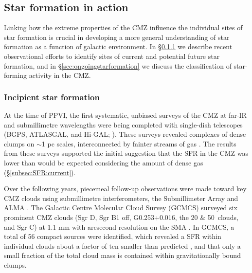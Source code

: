 \subsection{Star formation in action} 
\label{sec:sfinaction}

Linking how the extreme properties of the CMZ influence the individual sites of star formation is crucial in developing a more general understanding of star formation as a function of galactic environment. In \S\ref{sec:incipientsf} we describe recent observational efforts to identify sites of current and potential future star formation, and in \S\ref{sec:ongoingstarformation} we discuss the classification of star-forming activity in the CMZ.

\subsubsection{Incipient star formation} 
\label{sec:incipientsf}

At the time of PPVI, the first systematic, unbiased surveys of the CMZ at far-IR and submillimetre wavelengths were being completed with single-dish telescopes (BGPS, ATLASGAL, and Hi-GAL; \citealt{Bally2010, Molinari2011, Csengeri2016}). These surveys revealed complexes of dense clumps on $\sim$1 pc scales, interconnected by fainter streams of gas \citep[\S\ref{sec:3d};][]{Bally2010}. The results from these surveys supported the initial suggestion that the SFR in the CMZ was lower than would be expected considering the amount of dense gas (\S\ref{subsec:SFR:current}).

Over the following years, piecemeal follow-up observations were made toward key CMZ clouds using submillimetre interferometers, the Submillimeter Array \citep[SMA;][]{Kauffmann2013, Kauffmann2017a, Kauffmann2017b, Kendrew2013, Johnston2014, Lu2015, Lu2019b, Walker2018} and ALMA \citep{Rathborne2014b, Ginsburg2018b, Barnes2019, Uehara2019, Miyawaki2021, Walker2021, Lu2020, Lu2021}. The Galactic Centre Molecular Cloud Survey (GCMCS) surveyed six prominent CMZ clouds (Sgr D, Sgr B1 off, G0.253+0.016, the 20 \& 50\kms~clouds, and Sgr C) at 1.1 mm with arcsecond resolution on the SMA \citep{Lu2015, Lu2019b, Kauffmann2017b, Kauffmann2017c}. In GCMCS, a total of 56 compact sources were identified, which revealed a SFR within individual clouds about a factor of ten smaller than predicted \citep{Kauffmann2017b, Lu2019b}, and that only a small fraction of the total cloud mass \citep[1-9\%;][]{Lu2019b} is contained within gravitationally bound clumps. 

